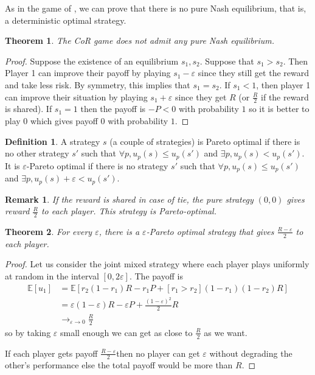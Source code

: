 \documentclass[preprint,12pt,authoryear]{elsarticle}
\newtheorem{theorem}{Theorem}[section]
\newtheorem*{remark}{Remark}
\theoremstyle{definition}
\newtheorem{definition}{Definition}[section]
\begin{document}
As in the game of \cite{Lotker2008-tx}, we can prove that there is no pure Nash equilibrium, that is, a deterministic optimal strategy.

\begin{theorem}
The CoR game does not admit any pure Nash equilibrium.
\end{theorem}
\begin{proof}
Suppose the existence of an equilibrium $s_1, s_2$. Suppose that $s_1 > s_2$. Then Player 1 can improve their payoff by playing $s_1 - \varepsilon$ since they still get the reward and take less risk. By symmetry, this implies that $s_1 = s_2$. If $s_1 < 1$, then player 1 can improve their situation by playing $s_1 + \varepsilon$ since they get $R$ (or $\frac{R}{2}$ if the reward is shared). If $s_1 = 1$ then the payoff is $-P < 0$ with probability $1$ so it is better to play $0$ which gives payoff $0$ with probability $1$.
\end{proof}

\begin{definition}A strategy $s$ (a couple of strategies) is Pareto optimal if there is no other strategy $s'$ such that $\forall p, u_p(s) \le u_p(s')$ and $\exists p, u_p(s) < u_p(s')$. It is $\varepsilon$-Pareto optimal if there is no strategy $s'$ such that $\forall p, u_p(s) \le u_p(s')$ and $\exists p, u_p(s) + \varepsilon < u_p(s')$.
\end{definition}
\begin{remark} If the reward is shared in case of tie, the pure strategy $(0,0)$ gives reward $\frac{R}{2}$ to each player. This strategy is Pareto-optimal.
\end{remark}
\begin{theorem}
\label{thm:pareto}
For every $\varepsilon$, there is a $\varepsilon$-Pareto optimal strategy that gives $\frac{R - \varepsilon}{2}$ to each player.
\end{theorem}
\begin{proof}
Let us consider the joint mixed strategy where each player plays uniformly at random in the interval $[0, 2 \varepsilon]$. The payoff is
\begin{align*} \mathbb{E}[u_1] &= \mathbb{E}\left[ r_2 (1-r_1) R - r_1 P + [ r_1 > r_2 ](1-r_1)(1-r_2) R\right] \\ &= \varepsilon (1-\varepsilon) R - \varepsilon P + \frac{(1-\varepsilon)^2}{2} R \\
&\rightarrow_{\varepsilon \rightarrow 0} \frac{R}{2} \end{align*}
so by taking $\varepsilon$ small enough we can get as close to $\frac{R}{2}$ as we want.

If each player gets payoff $\frac{R - \varepsilon}{2}$then no player can get $\varepsilon$ without degrading the other’s performance else the total payoff would be more than $R$.
\end{proof}
\end{document}
